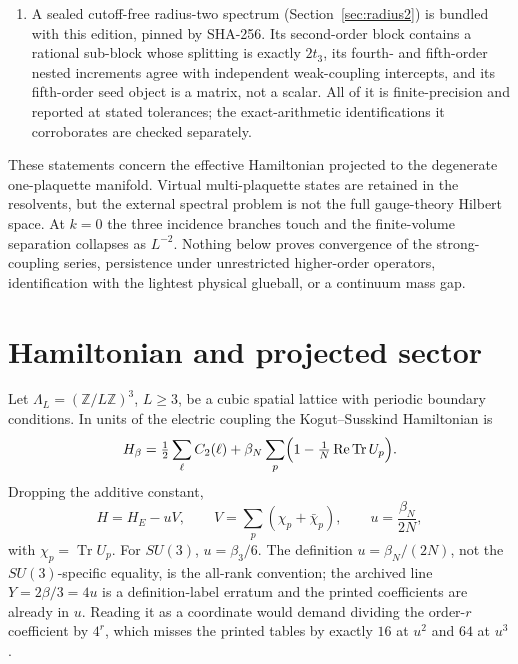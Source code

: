 \documentclass[11pt]{article}
\theoremstyle{plain}
\theoremstyle{definition}
\theoremstyle{remark}
\newcommand{\chk}[1]{}
\begin{document}
\begin{enumerate}
  complete off-axis operator remains open --- and by
  Theorem~\ref{thm:obstruction} it cannot be closed by any $\Gamma$ or axial
  datum.
\item A sealed cutoff-free radius-two spectrum
  (Section~\ref{sec:radius2}) is bundled with this edition, pinned by
  SHA-256. Its second-order block contains a rational sub-block whose
  splitting is exactly $2t_3$, its fourth- and fifth-order nested increments
  agree with independent weak-coupling intercepts, and its fifth-order seed
  object is a matrix, not a scalar. All of it is finite-precision and
  reported at stated tolerances; the exact-arithmetic identifications it
  corroborates are checked separately.
\end{enumerate}

These statements concern the effective Hamiltonian projected to the degenerate
one-plaquette manifold. Virtual multi-plaquette states are retained in the
resolvents, but the external spectral problem is not the full gauge-theory
Hilbert space. At $k=0$ the three incidence branches touch and the
finite-volume separation collapses as $L^{-2}$. Nothing below proves
convergence of the strong-coupling series, persistence under unrestricted
higher-order operators, identification with the lightest physical glueball, or
a continuum mass gap.

\section{Hamiltonian and projected sector}

Let $\Lambda_L=(\mathbb{Z}/L\mathbb{Z})^3$, $L\ge3$, be a cubic spatial
lattice with periodic boundary conditions. In units of the electric coupling
the Kogut--Susskind Hamiltonian is
\begin{equation}
  H_\beta=\tfrac12\sum_\ell C_2(\ell)
  +\beta_N\sum_p\Bigl(1-\tfrac1N\operatorname{Re}\operatorname{Tr}U_p\Bigr).
\end{equation}
Dropping the additive constant,
\begin{equation}\label{eq:H}
  H=H_E-uV,\qquad V=\sum_p(\chi_p+\bar\chi_p),\qquad u=\frac{\beta_N}{2N},
\end{equation}
with $\chi_p=\operatorname{Tr}U_p$. For $SU(3)$, $u=\beta_3/6$. The
definition $u=\beta_N/(2N)$, not the $SU(3)$-specific equality, is the
all-rank convention; the archived line $Y=2\beta/3=4u$ is a definition-label
erratum and the printed coefficients are already in $u$. Reading it as a
coordinate would demand dividing the order-$r$ coefficient by $4^r$, which
misses the printed tables by exactly $16$ at $u^2$ and $64$ at $u^3$.
\chk{the printed towers are canonical-u: 4*Delta(3u/2) reproduces them verbatim}
\chk{the 4**r rescaling breaks the bridge: order 2 off by 16, order 3 by 64}
\end{document}
